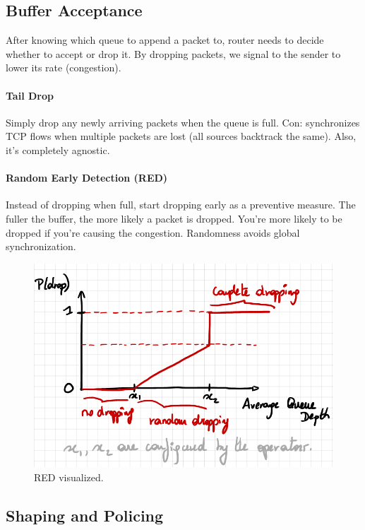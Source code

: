 
\subsection{Buffer Acceptance}

After knowing which queue to append a packet to, router needs to decide whether to accept or drop it. By dropping packets, we signal to the sender to lower its rate (congestion).

\paragraph{Tail Drop}
Simply drop any newly arriving packets when the queue is full. Con: synchronizes TCP flows when multiple packets are lost (all sources backtrack the same). Also, it's completely agnostic.

\paragraph{Random Early Detection (RED)}
Instead of dropping when full, start dropping early as a preventive measure. The fuller the buffer, the more likely a packet is dropped. You're more likely to be dropped if you're causing the congestion. Randomness avoids global synchronization.

\begin{figure}[h]
	\centering
	\includegraphics[scale=0.5]{images/2-red.PNG}
	\caption{RED visualized.}
	\label{fig:red}
\end{figure}

\subsection{Shaping and Policing}

